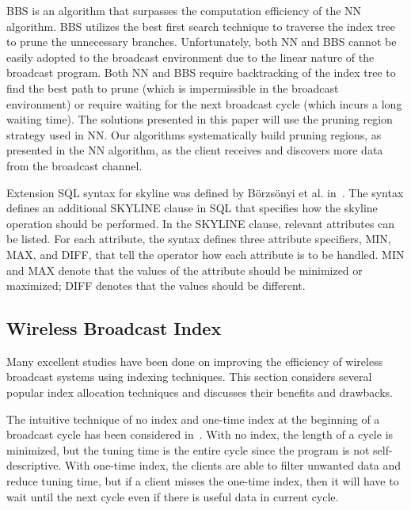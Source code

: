 
BBS is an algorithm that surpasses the computation efficiency of
the NN algorithm. BBS utilizes the best first search technique to
traverse the index tree to prune the unnecessary branches.
Unfortunately, both NN and BBS cannot be easily adopted to the
broadcast environment due to the linear nature of the broadcast
program. Both NN and BBS require backtracking of the index tree to
find the best path to prune (which is impermissible in the
broadcast environment) or require waiting for the next broadcast
cycle (which incurs a long waiting time). The solutions presented
in this paper will use the pruning region strategy used in NN. Our
algorithms systematically build pruning regions, as presented in
the NN algorithm, as the client receives and discovers more data
from the broadcast channel.

Extension SQL syntax for skyline was defined by B{\"o}rzs{\"o}nyi
et al. in~\cite{conf/icde/BorzsonyiKS01}. The syntax defines an
additional SKYLINE clause in SQL that specifies how the skyline
operation should be performed. In the SKYLINE clause, relevant
attributes can be listed. For each attribute, the syntax defines
three attribute specifiers, MIN, MAX, and DIFF, that tell the
operator how each attribute is to be handled. MIN and MAX denote
that the values of the attribute should be minimized or maximized;
DIFF denotes that the values should be different.

\subsection{Wireless Broadcast Index}\label{sec:wireless_bcast_index}

Many excellent studies have been done on improving the efficiency
of wireless broadcast systems using indexing techniques. This
section considers several popular index allocation techniques and
discusses their benefits and drawbacks.

The intuitive technique of no index and one-time index at the
beginning of a broadcast cycle has been considered
in~\cite{journals/tkde/ImielinskiVB97}. With no index, the length
of a cycle is minimized, but the tuning time is the entire cycle
since the program is not self-descriptive. With one-time index,
the clients are able to filter unwanted data and reduce tuning
time, but if a client misses the one-time index, then it will have
to wait until the next cycle even if there is useful data in
current cycle.

